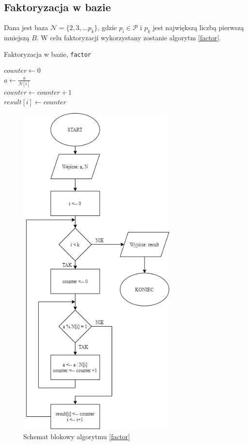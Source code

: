 \documentclass[]{article}
\begin{document}
	\subsection{Faktoryzacja w bazie}
		Dana jest baza \(\mathcal{N} = \{2, 3, \dots p_k\}\), gdzie \(p_i \in \mathcal{P}\) i \(p_k\) jest największą liczbą pierwszą mniejszą \(B\). 
		W celu faktoryzacji wykorzystany zostanie algorytm \ref{factor}.
		\newline
		\begin{algorithm}[H]
			\SetAlgoLined
			\caption{Faktoryzacja w bazie, \texttt{factor}}
			\label{factor}
			{
				\(counter \gets 0\) \\
				{
					\(a \gets \frac{a}{N[i]}\) \\
					\(counter \gets counter + 1\) \\
				}
				\(result[i] \gets counter\) \\
			}
		\end{algorithm}
\clearpage
		\begin{figure}[H]
			\begin{center}
				\includegraphics[width=8cm]{alg 4.png} \caption{Schemat blokowy algorytmu \ref{factor}}
			\end{center}
		\end{figure}
	
\end{document}
